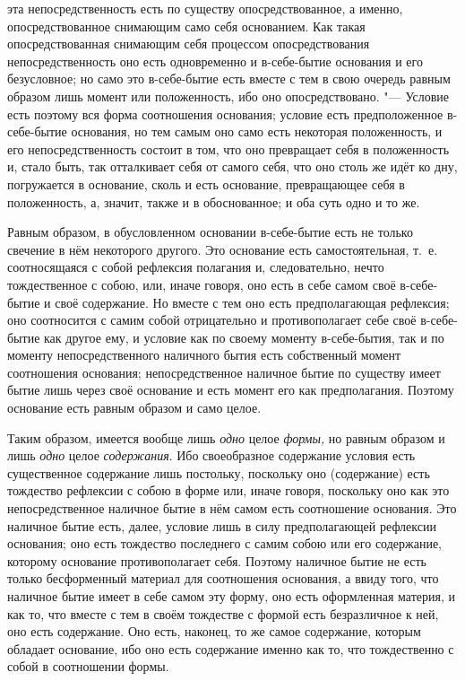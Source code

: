 эта непосредственность есть по существу опосредствованное, а именно,
опосредствованное снимающим само себя основанием. Как такая
опосредствованная снимающим себя процессом опосредствования
непосредственность оно есть одновременно и в-себе-бытие основания и его
безусловное; но само это в-себе-бытие есть вместе с тем в свою очередь
равным образом лишь момент или положенность, ибо оно опосредствовано. "---
Условие есть поэтому вся форма соотношения основания; условие есть
предположенное в-себе-бытие основания, но тем самым оно само есть некоторая
положенность, и его непосредственность состоит в том, что оно превращает
себя в положенность и, стало быть, так отталкивает себя от самого себя, что
оно столь же идёт ко дну, погружается в основание, сколь и есть основание,
превращающее себя в положенность, а, значит, также и в обоснованное; и оба
суть одно и то же.

Равным образом, в обусловленном основании в-себе-бытие есть не только
свечение в нём некоторого другого. Это основание есть самостоятельная,
т.~е. соотносящаяся с собой рефлексия полагания и, следовательно, нечто
тождественное с собою, или, иначе говоря, оно есть в себе самом своё
в-себе-бытие и своё содержание. Но вместе с тем оно есть предполагающая
рефлексия; оно соотносится с самим собой отрицательно и противополагает
себе своё в-себе-бытие как другое ему, и условие как по своему моменту
в-себе-бытия, так и по моменту непосредственного наличного бытия есть
собственный момент соотношения основания; непосредственное наличное бытие
по существу имеет бытие лишь через своё основание и есть момент его как
предполагания. Поэтому основание есть равным образом и само целое.

Таким образом, имеется вообще лишь {\em одно} целое
{\em формы,} но равным образом и лишь
{\em одно} целое {\em содержания}.
Ибо своеобразное содержание условия есть существенное содержание лишь
постольку, поскольку оно (содержание) есть тождество рефлексии с собою в
форме или, иначе говоря, поскольку оно как это непосредственное наличное
бытие в нём самом есть соотношение основания. Это наличное бытие есть,
далее, условие лишь в силу предполагающей рефлексии основания; оно есть
тождество последнего с самим собою или его содержание, которому основание
противополагает себя. Поэтому наличное бытие не есть только бесформенный
материал для соотношения основания, а ввиду того, что наличное бытие имеет
в себе самом эту форму, оно есть оформленная материя, и как то, что вместе
с тем в своём тождестве с формой есть безразличное к ней, оно есть
содержание. Оно есть, наконец, то же самое содержание, которым обладает
основание, ибо оно есть содержание именно как то, что тождественно с собой
в соотношении формы.

